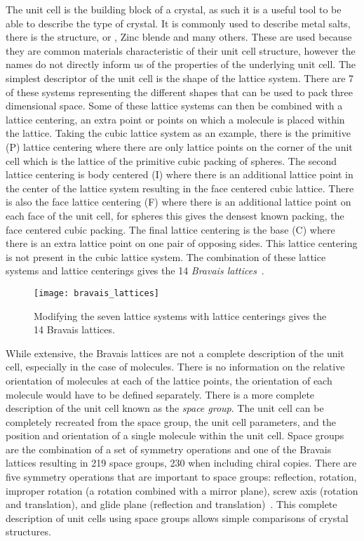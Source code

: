The unit cell is the building block of a crystal, as such it is a useful tool to be able to describe the type of crystal. It is commonly used to describe metal salts, there is the  structure, or , Zinc blende and many others. These are used because they are common materials characteristic of their unit cell structure, however the names do not directly inform us of the properties of the underlying unit cell. The simplest descriptor of the unit cell is the shape of the lattice system. There are 7 of these systems representing the different shapes that can be used to pack three dimensional space. Some of these lattice systems can then be combined with a lattice centering, an extra point or points on which a molecule is placed within the lattice. Taking the cubic lattice system as an example, there is the primitive (P) lattice centering where there are only lattice points on the corner of the unit cell which is the lattice of the primitive cubic packing of spheres. The second lattice centering is body centered (I) where there is an additional lattice point in the center of the lattice system resulting in the face centered cubic lattice. There is also the face lattice centering (F) where there is an additional lattice point on each face of the unit cell, for spheres this gives the densest known packing, the face centered cubic packing. The final lattice centering is the base (C) where there is an extra lattice point on one pair of opposing sides. This lattice centering is not present in the cubic lattice system. The combination of these lattice systems and lattice centerings gives the 14 \emph{Bravais lattices}~. 

\begin{figure}
    \texttt{[image: bravais\_lattices]}
    \caption{Modifying the seven lattice systems with lattice centerings gives the 14 Bravais lattices.}
    \label{fig:bravais}
\end{figure}

While extensive, the Bravais lattices are not a complete description of the unit cell, especially in the case of molecules. There is no information on the relative orientation of molecules at each of the lattice points, the orientation of each molecule would have to be defined separately. There is a more complete description of the unit cell known as the \emph{space group}. The unit cell can be completely recreated from the space group, the unit cell parameters, and the position and orientation of a single molecule within the unit cell. Space groups are the combination of a set of symmetry operations and one of the Bravais lattices resulting in 219 space groups, 230 when including chiral copies. There are five symmetry operations that are important to space groups: reflection, rotation, improper rotation (a rotation combined with a mirror plane), screw axis (rotation and translation), and glide plane (reflection and translation)~. This complete description of unit cells using space groups allows simple comparisons of crystal structures.


